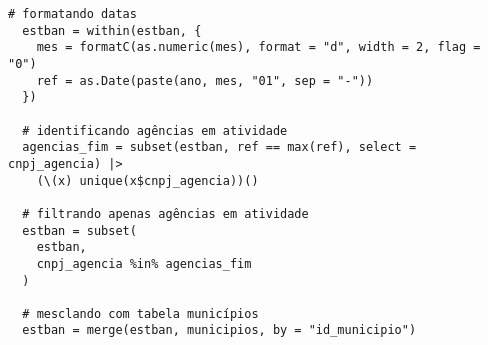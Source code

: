 \begin{anexosenv}
\begin{lstlisting}[frame=single]
  # formatando datas
  estban = within(estban, {
    mes = formatC(as.numeric(mes), format = "d", width = 2, flag = "0")
    ref = as.Date(paste(ano, mes, "01", sep = "-"))
  })
  
  # identificando agências em atividade
  agencias_fim = subset(estban, ref == max(ref), select = cnpj_agencia) |>
    (\(x) unique(x$cnpj_agencia))()
  
  # filtrando apenas agências em atividade
  estban = subset(
    estban,
    cnpj_agencia %in% agencias_fim
  )

  # mesclando com tabela municípios
  estban = merge(estban, municipios, by = "id_municipio")

\end{lstlisting}

\end{anexosenv}

\printindex
